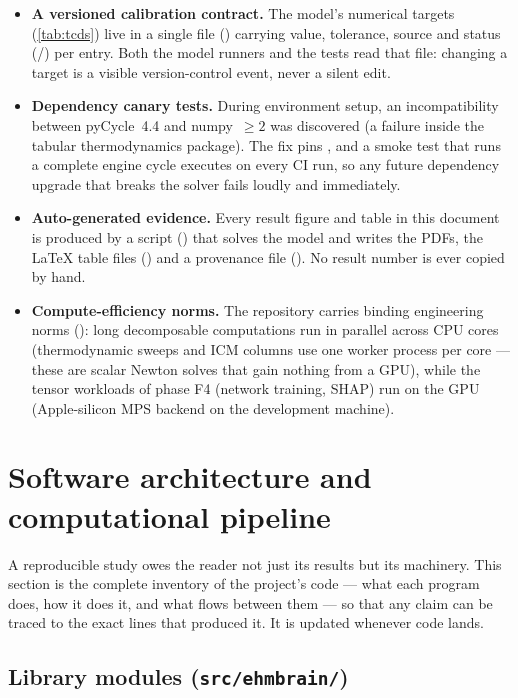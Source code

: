 \begin{itemize}
  \item \textbf{A versioned calibration contract.} The model's numerical targets
    (\cref{tab:tcds}) live in a single file () carrying
    value, tolerance, source and status (/) per entry. Both the
    model runners and the tests read that file: changing a target is a visible version-control
    event, never a silent edit.
  \item \textbf{Dependency canary tests.} During environment setup, an incompatibility between
    pyCycle~4.4 and numpy~$\geq 2$ was discovered (a failure inside the tabular thermodynamics
    package). The fix pins , and a smoke test that runs a complete engine cycle
    executes on every CI run, so any future dependency upgrade that breaks the solver fails
    loudly and immediately.
  \item \textbf{Auto-generated evidence.} Every result figure and table in this document is
    produced by a script () that solves the model and
    writes the PDFs, the \LaTeX{} table files () and a
    provenance file (). No result number is ever copied by hand.
  \item \textbf{Compute-efficiency norms.} The repository carries binding engineering norms
    (): long decomposable computations run in parallel across
    CPU cores (thermodynamic sweeps and ICM columns use one worker process per core --- these
    are scalar Newton solves that gain nothing from a GPU), while the tensor workloads of phase
    F4 (network training, SHAP) run on the GPU (Apple-silicon MPS backend on the development
    machine).
\end{itemize}

\section{Software architecture and computational pipeline}
\label{sec:software}

A reproducible study owes the reader not just its results but its machinery. This section is
the complete inventory of the project's code --- what each program does, how it does it, and
what flows between them --- so that any claim can be traced to the exact lines that produced
it. It is updated whenever code lands.

\subsection{Library modules (\texttt{src/ehmbrain/})}

